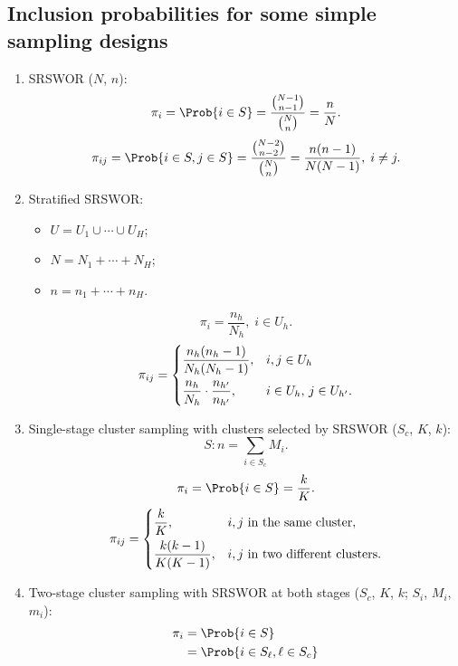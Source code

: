 \subsection*{Inclusion probabilities for some simple sampling designs}
\begin{enumerate}[(1)]
      \item SRSWOR ($ N $, $ n $):
            \[ \pi_i=\Prob{i\in S}=\frac{\binom{N-1}{n-1}}{\binom{N}{n}}=\frac{n}{N}. \]
            \[ \pi_{ij}=\Prob{i\in S,j\in S}=\frac{\binom{N-2}{n-2}}{\binom{N}{n}}=\frac{n(n-1)}{N(N-1)},\; i\ne j. \]
      \item Stratified SRSWOR\@:
            \begin{itemize}
                  \item $ U=U_1\cup \cdots \cup U_H $;
                  \item $ N=N_1+\cdots+N_H $;
                  \item $ n=n_1+\cdots+n_H $.
            \end{itemize}
            \[ \pi_i=\frac{n_h}{N_h},\; i\in U_h. \]
            \[ \pi_{ij}=\begin{dcases}
                        \frac{n_h(n_h-1)}{N_h(N_h-1)},                          & i,j\in U_h                     \\
                        \frac{n_h}{N_h}\cdot \frac{n_{h^\prime}}{n_{h^\prime}}, & i\in U_h,\, j\in U_{h^\prime}.
                  \end{dcases} \]
      \item Single-stage cluster sampling with clusters selected by SRSWOR ($ S_c $, $ K $, $ k $):
            \[ S\colon n=\sum_{i\in S_c}M_i. \]
            \[ \pi_i=\Prob{i\in S}=\frac{k}{K}. \]
            \[ \pi_{ij}=\begin{dcases}
                        \frac{k}{K},           & \text{$i,j$ in the same cluster},       \\
                        \frac{k(k-1)}{K(K-1)}, & \text{$i,j$ in two different clusters}.
                  \end{dcases} \]
      \item Two-stage cluster sampling with SRSWOR at both stages ($ S_c $, $ K $, $ k $; $ S_i $, $ M_i $, $ m_i $):
            \begin{align*}
                  \pi_i
                   & =\Prob{i\in S}                                             \\
                   & =\Prob{i\in S_{\ell},\ell\in S_c}                          \\

\end{align*}
\end{enumerate}
